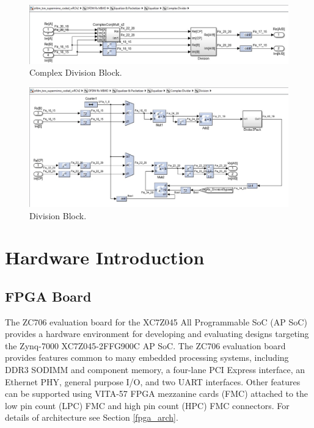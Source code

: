 \begin{figure}
\centering
\includegraphics[width=\textwidth]{content/fig/cmpx_div.JPG}
\caption{Complex Division Block.}
\label{fig:cmpx_div}
\end{figure}

\begin{figure}
\centering
\includegraphics[width=\textwidth]{content/fig/division.JPG}
\caption{Division Block.}
\label{fig:division}
\end{figure}


\section{Hardware Introduction}
\subsection{FPGA Board}

The ZC706 evaluation board for the XC7Z045 All Programmable SoC (AP SoC) provides a hardware environment for developing and evaluating designs targeting the Zynq-7000 XC7Z045-2FFG900C AP SoC. The ZC706 evaluation board provides features common to
many embedded processing systems, including DDR3 SODIMM and component memory, a four-lane PCI Express interface, an Ethernet PHY, general purpose I/O, and two UART interfaces. Other features can be supported using VITA-57 FPGA mezzanine cards (FMC) attached to the low pin count (LPC) FMC and high pin count (HPC) FMC connectors. For details of architecture see Section \ref{fpga_arch}.\\

